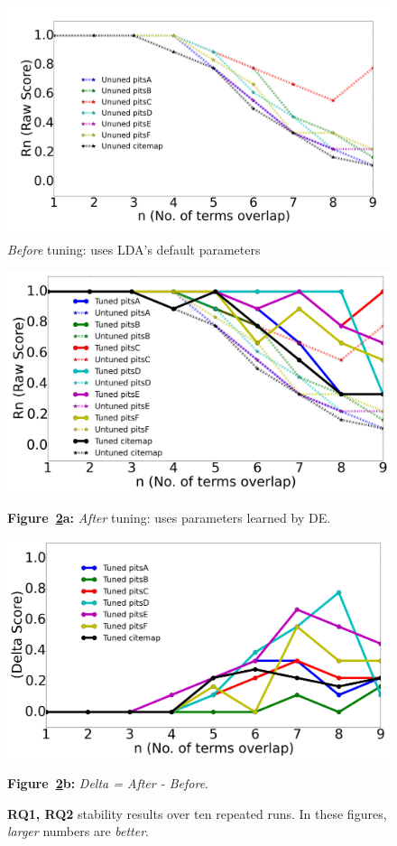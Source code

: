 \documentclass[twocolumn,5p,sort&compress]{elsarticle}
\theoremstyle{break}
\begin{document}
 
\begin{figure}[!b]
  \begin{center}
    \includegraphics[width=\linewidth]{./fig/Vem_untuned.png}
    \end{center}
  \caption{{\em Before} tuning: uses LDA's default parameters}\label{fig:delta11}  
\end{figure}
\begin{figure}[!b]
        \begin{center}
        \includegraphics[width=0.9\linewidth]{./fig/raw_graph.png}

  {\bf Figure~\ref{fig:delta}a:}  {\em After} tuning: uses parameters learned by DE.

        \includegraphics[width=0.9\linewidth]{./fig/tuned_delta_vem.png}

  {\bf Figure~\ref{fig:delta}b:}  {\em Delta = After - Before}.
  \end{center}
    \caption{{\bf RQ1, RQ2} stability results over ten repeated runs. In these figures, {\em larger} numbers
    are {\em better}.}\label{fig:delta}
\end{figure}
\end{document}

